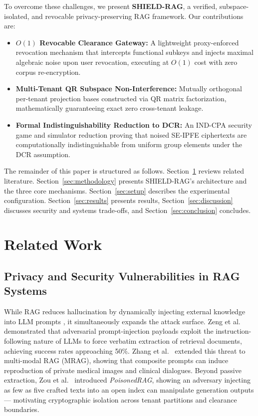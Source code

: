 \documentclass[10pt,a4paper]{article}
\begin{document}
To overcome these challenges, we present \textbf{SHIELD-RAG}, a verified, subspace-isolated, and revocable privacy-preserving RAG framework. Our contributions are:
\begin{itemize}
    \item \textbf{$O(1)$ Revocable Clearance Gateway:} A lightweight proxy-enforced revocation mechanism that intercepts functional subkeys and injects maximal algebraic noise upon user revocation, executing at $O(1)$ cost with zero corpus re-encryption.
    \item \textbf{Multi-Tenant QR Subspace Non-Interference:} Mutually orthogonal per-tenant projection bases constructed via QR matrix factorization, mathematically guaranteeing exact zero cross-tenant leakage.
    \item \textbf{Formal Indistinguishability Reduction to DCR:} An IND-CPA security game and simulator reduction proving that noised SE-IPFE ciphertexts are computationally indistinguishable from uniform group elements under the DCR assumption.
\end{itemize}

The remainder of this paper is structured as follows. Section~\ref{sec:related_work} reviews related literature. Section~\ref{sec:methodology} presents SHIELD-RAG's architecture and the three core mechanisms. Section~\ref{sec:setup} describes the experimental configuration. Section~\ref{sec:results} presents results, Section~\ref{sec:discussion} discusses security and systems trade-offs, and Section~\ref{sec:conclusion} concludes.

\section{Related Work}
\label{sec:related_work}

\subsection{Privacy and Security Vulnerabilities in RAG Systems}
While RAG reduces hallucination by dynamically injecting external knowledge into LLM prompts \cite{lewis2020rag, shuster2021retrieval}, it simultaneously expands the attack surface. Zeng et al.~\cite{zeng2024good} demonstrated that adversarial prompt-injection payloads exploit the instruction-following nature of LLMs to force verbatim extraction of retrieval documents, achieving success rates approaching 50\%. Zhang et al.~\cite{zhang2025beyondtext} extended this threat to multi-modal RAG (MRAG), showing that composite prompts can induce reproduction of private medical images and clinical dialogues. Beyond passive extraction, Zou et al.~\cite{zou2025poisonedrag} introduced \textit{PoisonedRAG}, showing an adversary injecting as few as five crafted texts into an open index can manipulate generation outputs — motivating cryptographic isolation across tenant partitions and clearance boundaries.
\end{document}
